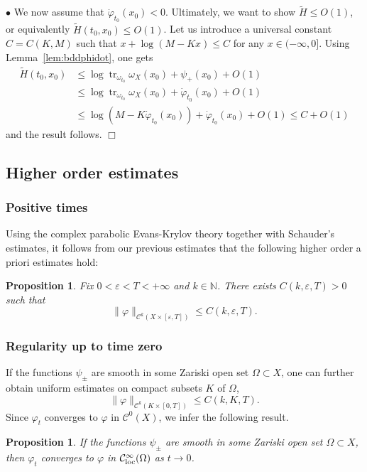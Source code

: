 \documentclass[a4paper,11pt,leqno,english]{smfart}
\theoremstyle{plain}
\theoremstyle{plain}
\numberwithin{equation}{section} %
\numberwithin{figure}{section} %
\theoremstyle{plain}
\newtheorem{prop}[thm]{Proposition} %
\theoremstyle{plain}
\theoremstyle{remark}
\theoremstyle{remark}
\theoremstyle{definition}
\theoremstyle{plain}
\theoremstyle{plain}
\theoremstyle{definition}
\newcommand{\N}{{\mathbb{N}}}
\newcommand{\wt}{\widetilde}
\newcommand{\e}{\varepsilon}
\newcommand{\om}{\omega}
\newcommand{\f}{\varphi}
\newcommand{\p}{\psi}
\renewcommand{\le}{\leq}
\newcommand{\tr}{\operatorname{tr}}
\begin{document}
\smallskip

$\bullet$ We now assume that $\dot\f_{t_0}(x_0) < 0$. Ultimately, we want to show $\wt H \le O(1)$, 
or equivalently $\wt H(t_0,x_0) \le O(1)$. Let us introduce a universal constant $C=C(K,M)$ such that 
$x+\log(M-Kx) \le C$ for any $x\in (-\infty,0]$. Using Lemma~\ref{lem:bddphidot}, one gets 
\begin{align*}
\wt H(t_0,x_0) & \le \log \tr_{\om_{t_0}}\om_X(x_0)+\psi_+(x_0) +O(1)\\
&\le  \log \tr_{\om_{t_0}}\om_X(x_0)+\dot\f_{t_0}(x_0)+O(1)\\
&\le \log(M-K\dot\f_{t_0}(x_0))+\dot\f_{t_0}(x_0)+O(1)
\le C+O(1)
\end{align*}
and the result follows.
$\Box$


 

\subsection{Higher order estimates}


\subsubsection{Positive times}
 

Using the complex parabolic Evans-Krylov theory together with Schauder’s estimates, it follows from our previous estimates that the following higher order a priori estimates hold:

\begin{prop} \label{pro:higher}
Fix $0 <\e <T<+\infty$ and $k \in \N$. There exists 
$C(k,\e,T)>0$ such that 
$$
\|\f\|_{{\mathcal C}^k(X \times [\e,T])} \leq C(k,\e,T).
$$
\end{prop}


\subsubsection{Regularity up to time zero}

If the functions $\p_{\pm}$ are smooth in some Zariski open set $\Omega \subset X$,
one can further obtain uniform estimates on compact subsets $K$ of $\Omega$,
$$
\|\f\|_{{\mathcal C}^k(K \times [0,T])} \leq C(k,K,T).
$$
Since $\f_t$ converges to $\f$ in ${\mathcal C}^0(X)$, we infer the following result.


\begin{prop} \label{pro:higherbis}
If the functions $\p_{\pm}$ are smooth in some Zariski open set $\Omega \subset X$,
then $\f_t$ converges to $\f$ in ${\mathcal C}^{\infty}_{\rm loc}(\Omega)$ as $t \rightarrow 0$.
\end{prop}
\end{document}
